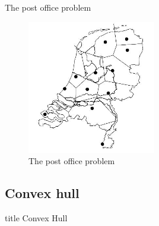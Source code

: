 \begin{frame}{The post office problem}
    \begin{figure}
        \centering
        \includegraphics[width=0.5\textwidth]{figs/L07-post-office-problem.jpg}
        
        \caption{The post office problem \cite{DeBerg2008}}
        \label{fig:my_label}
    \end{figure}
\end{frame}

\subsection{Convex hull}

\begin{frame}
\vfill
\centering

\begin{beamercolorbox}[sep=8pt,center,shadow=true,rounded=true]{title}
Convex Hull
\end{beamercolorbox}
\vfill
    
\end{frame}




